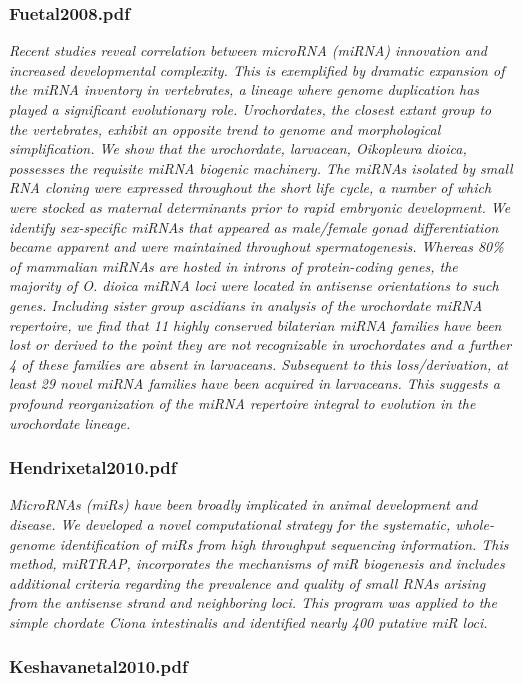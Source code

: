 \subsubsection{Fuetal2008.pdf}
\cite{Fu2008}
\textit{Recent studies reveal correlation between microRNA (miRNA) innovation and increased developmental complexity. This is exemplified by dramatic expansion of the miRNA inventory in vertebrates, a lineage where genome duplication has played a significant evolutionary role. Urochordates, the closest extant group to the vertebrates, exhibit an opposite trend to genome and morphological simplification. We show that the urochordate, larvacean, Oikopleura dioica, possesses the requisite miRNA biogenic machinery. The miRNAs isolated by small RNA cloning were expressed throughout the short life cycle, a number of which were stocked as maternal determinants prior to rapid embryonic development. We identify sex-specific miRNAs that appeared as male/female gonad differentiation became apparent and were maintained throughout spermatogenesis. Whereas 80{\%} of mammalian miRNAs are hosted in introns of protein-coding genes, the majority of O. dioica miRNA loci were located in antisense orientations to such genes. Including sister group ascidians in analysis of the urochordate miRNA repertoire, we find that 11 highly conserved bilaterian miRNA families have been lost or derived to the point they are not recognizable in urochordates and a further 4 of these families are absent in larvaceans. Subsequent to this loss/derivation, at least 29 novel miRNA families have been acquired in larvaceans. This suggests a profound reorganization of the miRNA repertoire integral to evolution in the urochordate lineage.}
\subsubsection{Hendrixetal2010.pdf}
\cite{Hendrix2010}
\textit{MicroRNAs (miRs) have been broadly implicated in animal development and disease. We developed a novel computational strategy for the systematic, whole-genome identification of miRs from high throughput sequencing information. This method, miRTRAP, incorporates the mechanisms of miR biogenesis and includes additional criteria regarding the prevalence and quality of small RNAs arising from the antisense strand and neighboring loci. This program was applied to the simple chordate Ciona intestinalis and identified nearly 400 putative miR loci.}

\subsubsection{Keshavanetal2010.pdf}

